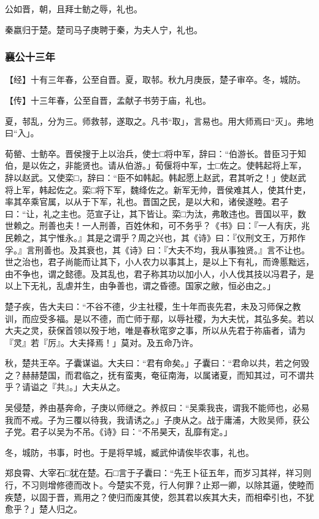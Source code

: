 \documentclass[]{article}
\begin{document}
公如晋，朝，且拜士鲂之辱，礼也。

秦嬴归于楚。楚司马子庚聘于秦，为夫人宁，礼也。

\hypertarget{header-n1976}{%
\subsubsection{襄公十三年}\label{header-n1976}}

【经】十有三年春，公至自晋。夏，取邿。秋九月庚辰，楚子审卒。冬，城防。

【传】十三年春，公至自晋，孟献子书劳于庙，礼也。

夏，邿乱，分为三。师救邿，遂取之。凡书``取」，言易也。用大师焉曰``灭」。弗地曰``入」。

荀罃、士鲂卒。晋侯搜于上以治兵，使士□将中军，辞曰：``伯游长。昔臣习于知伯，是以佐之，非能贤也。请从伯游。」荀偃将中军，士□佐之。使韩起将上军，辞以赵武。又使栾□，辞曰：``臣不如韩起。韩起愿上赵武，君其听之！」使赵武将上军，韩起佐之。栾□将下军，魏绛佐之。新军无帅，晋侯难其人，使其什吏，率其卒乘官属，以从于下军，礼也。晋国之民，是以大和，诸侯遂睦。君子曰：``让，礼之主也。范宣子让，其下皆让。栾□为汰，弗敢违也。晋国以平，数世赖之。刑善也夫！一人刑善，百姓休和，可不务乎？《书》曰：『一人有庆，兆民赖之，其宁惟永。』其是之谓乎？周之兴也，其《诗》曰：『仪刑文王，万邦作孚。』言刑善也。及其衰也，其《诗》曰：『大夫不均，我从事独贤。』言不让也。世之治也，君子尚能而让其下，小人农力以事其上，是以上下有礼，而谗慝黜远，由不争也，谓之懿德。及其乱也，君子称其功以加小人，小人伐其技以冯君子，是以上下无礼，乱虐并生，由争善也，谓之昏德。国家之敝，恒必由之。」

楚子疾，告大夫曰：``不谷不德，少主社稷，生十年而丧先君，未及习师保之教训，而应受多福。是以不德，而亡师于鄢，以辱社稷，为大夫忧，其弘多矣。若以大夫之灵，获保首领以殁于地，唯是春秋窀穸之事，所以从先君于祢庙者，请为『灵』若『厉』。大夫择焉！」莫对。及五命乃许。

秋，楚共王卒。子囊谋谥。大夫曰：``君有命矣。」子囊曰：``君命以共，若之何毁之？赫赫楚国，而君临之，抚有蛮夷，奄征南海，以属诸夏，而知其过，可不谓共乎？请谥之『共』。」大夫从之。

吴侵楚，养由基奔命，子庚以师继之。养叔曰：``吴乘我丧，谓我不能师也，必易我而不戒。子为三覆以待我，我请诱之。」子庚从之。战于庸浦，大败吴师，获公子党。君子以吴为不吊。《诗》曰：``不吊昊天，乱靡有定。」

冬，城防，书事，时也。于是将早城，臧武仲请俟毕农事，礼也。

郑良霄、大宰石□犹在楚。石□言于子囊曰：``先王卜征五年，而岁习其祥，祥习则行，不习则增修德而改卜。今楚实不竞，行人何罪？止郑一卿，以除其逼，使睦而疾楚，以固于晋，焉用之？使归而废其使，怨其君以疾其大夫，而相牵引也，不犹愈乎？」楚人归之。
\end{document}
